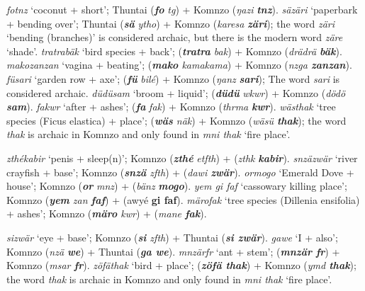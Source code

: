 \begin{exe}
\ex
\label{ex656}
\begin{xlist}
	\ex \emph{fotnz} `coconut + short';  Thuntai (\emph{\textbf{fo}} \emph{tg}) + Komnzo (\emph{ŋazi} \emph{\textbf{tnz}}).
	\ex \emph{säzäri} `paperbark + bending over';  Thuntai (\emph{\textbf{sä}} \emph{ytho}) + Komnzo (\emph{karesa} \emph{\textbf{zäri}}); the word \emph{zäri} `bending (branches)' is considered archaic, but there is the modern word \emph{zäre} `shade'.
	\ex \emph{tratrabäk} `bird species + back';  (\emph{\textbf{tratra} bak}) + Komnzo (\emph{drädrä \textbf{bäk}}).
	\ex \emph{makozanzan} `vagina + beating';  (\emph{\textbf{mako} kamakama}) + Komnzo (\emph{nzga \textbf{zanzan}}).
	\ex \emph{füsari} `garden row + axe';  (\emph{\textbf{fü}} \emph{bilé}) + Komnzo (\emph{ŋanz} \emph{\textbf{sari}}); The word \emph{sari} is considered archaic.
	\ex \emph{düdüsam} `broom + liquid';  (\emph{\textbf{düdü}} \emph{wkwr}) + Komnzo (\emph{dödö} \emph{\textbf{sam}}).
	\ex \emph{fakwr} `after + ashes';  (\emph{\textbf{fa}} \emph{fak}) + Komnzo (\emph{thrma} \emph{\textbf{kwr}}).
	\ex \emph{wästhak} `tree species (Ficus elastica) + place';  (\emph{\textbf{wäs} näk}) + Komnzo (\emph{wäsü \textbf{thak}}); the word \emph{thak} is archaic in Komnzo and only found in \emph{mni thak} `fire place'.\label{ex659}
\end{xlist}
\end{exe}%
\begin{exe}
\ex
\label{ex657}
\begin{xlist}
	\ex \emph{zthékabir} `penis + sleep(n)'; Komnzo (\emph{\textbf{zthé}} \emph{etfth}) +  (\emph{zthk} \emph{\textbf{kabir}}).
	\ex \emph{snzäzwär} `river crayfish + base'; Komnzo (\emph{\textbf{snzä} zfth}) +  (\emph{dawi \textbf{zwär}}).\label{ex660}
	\ex \emph{ormogo} `Emerald Dove + house'; Komnzo (\emph{\textbf{or}} \emph{mnz}) +  (\emph{bänz} \emph{\textbf{mogo}}).
	\ex \emph{yem gi faf} `cassowary killing place'; Komnzo (\emph{\textbf{yem} zan \textbf{faf}}) +  (awyé \textbf{gi faf}).
	\ex \emph{märofak} `tree species (Dillenia ensifolia) + ashes'; Komnzo (\emph{\textbf{märo} kwr}) +  (\emph{mane \textbf{fak}}).
\end{xlist}
\end{exe}%
\begin{exe}
\ex
\label{ex658}
\begin{xlist}
	\ex \emph{sizwär} `eye + base'; Komnzo (\emph{\textbf{si} zfth}) +  Thuntai (\emph{\textbf{si zwär}}).
	\ex \emph{gawe} `I + also'; Komnzo (\emph{nzä \textbf{we}}) +  Thuntai (\emph{\textbf{ga we}}).
	\ex \emph{mnzärfr} `ant + stem';  (\emph{\textbf{mnzär fr}}) + Komnzo (\emph{msar \textbf{fr}}).
	\ex \emph{zöfäthak} `bird + place';  (\emph{\textbf{zöfä thak}}) + Komnzo (\emph{ymd \textbf{thak}}); the word \emph{thak} is archaic in Komnzo and only found in \emph{mni thak} `fire place'.
\end{xlist}
\end{exe}%

